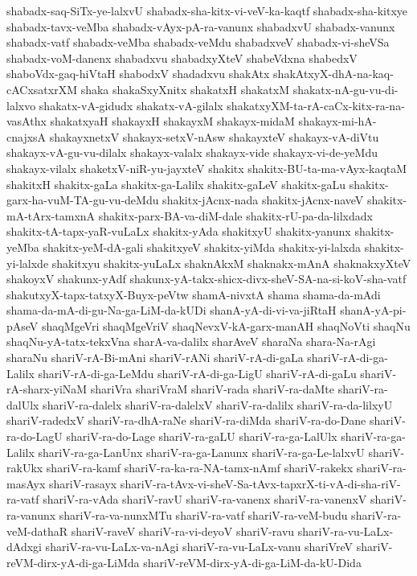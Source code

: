 {shabadx-saq-SiTx-ye-lalxvU
shabadx-sha-kitx-vi-veV-ka-kaqtf
shabadx-sha-kitxye
shabadx-tavx-veMba
shabadx-vAyx-pA-ra-vanunx
shabadxvU
shabadx-vanunx
shabadx-vatf
shabadx-veMba
shabadx-veMdu
shabadxveV
shabadx-vi-sheVSa
shabadx-voM-danenx
shabadxvu
shabadxyXteV
shabeVdxna
shabedxV
shaboVdx-gaq-hiVtaH
shabodxV
shadadxvu
shakAtx
shakAtxyX-dhA-na-kaq-cACxsatxrXM
shaka
shakaSxyXnitx
shakatxH
shakatxM
shakatx-nA-gu-vu-di-lalxvo
shakatx-vA-gidudx
shakatx-vA-gilalx
shakatxyXM-ta-rA-caCx-kitx-ra-na-vasAthx
shakatxyaH
shakayxH
shakayxM
shakayx-midaM
shakayx-mi-hA-cnajxsA
shakayxnetxV
shakayx-setxV-nAsw
shakayxteV
shakayx-vA-diVtu
shakayx-vA-gu-vu-dilalx
shakayx-valalx
shakayx-vide
shakayx-vi-de-yeMdu
shakayx-vilalx
shaketxV-niR-yu-jayxteV
shakitx
shakitx-BU-ta-ma-vAyx-kaqtaM
shakitxH
shakitx-gaLa
shakitx-ga-Lalilx
shakitx-gaLeV
shakitx-gaLu
shakitx-garx-ha-vuM-TA-gu-vu-deMdu
shakitx-jAcnx-nada
shakitx-jAcnx-naveV
shakitx-mA-tArx-tamxnA
shakitx-parx-BA-va-diM-dale
shakitx-rU-pa-da-lilxdadx
shakitx-tA-tapx-yaR-vuLaLx
shakitx-yAda
shakitxyU
shakitx-yanunx
shakitx-yeMba
shakitx-yeM-dA-gali
shakitxyeV
shakitx-yiMda
shakitx-yi-lalxda
shakitx-yi-lalxde
shakitxyu
shakitx-yuLaLx
shaknAkxM
shaknakx-mAnA
shaknakxyXteV
shakoyxV
shakunx-yAdf
shakunx-yA-takx-shicx-divx-sheV-SA-na-si-koV-sha-vatf
shakutxyX-tapx-tatxyX-Buyx-peVtw
shamA-nivxtA
shama
shama-da-mAdi
shama-da-mA-di-gu-Na-ga-LiM-da-kUDi
shanA-yA-di-vi-va-jiRtaH
shanA-yA-pi-pAseV
shaqMgeVri
shaqMgeVriV
shaqNevxV-kA-garx-manAH
shaqNoVti
shaqNu
shaqNu-yA-tatx-tekxVna
sharA-va-dalilx
sharAveV
sharaNa
shara-Na-rAgi
sharaNu
shariV-rA-Bi-mAni
shariV-rANi
shariV-rA-di-gaLa
shariV-rA-di-ga-Lalilx
shariV-rA-di-ga-LeMdu
shariV-rA-di-ga-LigU
shariV-rA-di-gaLu
shariV-rA-sharx-yiNaM
shariVra
shariVraM
shariV-rada
shariV-ra-daMte
shariV-ra-dalUlx
shariV-ra-dalelx
shariV-ra-dalelxV
shariV-ra-dalilx
shariV-ra-da-lilxyU
shariV-radedxV
shariV-ra-dhA-raNe
shariV-ra-diMda
shariV-ra-do-Dane
shariV-ra-do-LagU
shariV-ra-do-Lage
shariV-ra-gaLU
shariV-ra-ga-LalUlx
shariV-ra-ga-Lalilx
shariV-ra-ga-LanUnx
shariV-ra-ga-Lanunx
shariV-ra-ga-Le-lalxvU
shariV-rakUkx
shariV-ra-kamf
shariV-ra-ka-ra-NA-tamx-nAmf
shariV-rakekx
shariV-ra-masAyx
shariV-rasayx
shariV-ra-tAvx-vi-sheV-Sa-tAvx-tapxrX-ti-vA-di-sha-riV-ra-vatf
shariV-ra-vAda
shariV-ravU
shariV-ra-vanenx
shariV-ra-vanenxV
shariV-ra-vanunx
shariV-ra-va-nunxMTu
shariV-ra-vatf
shariV-ra-veM-budu
shariV-ra-veM-dathaR
shariV-raveV
shariV-ra-vi-deyoV
shariV-ravu
shariV-ra-vu-LaLx-dAdxgi
shariV-ra-vu-LaLx-va-nAgi
shariV-ra-vu-LaLx-vanu
shariVreV
shariV-reVM-dirx-yA-di-ga-LiMda
shariV-reVM-dirx-yA-di-ga-LiM-da-kU-Dida
}
